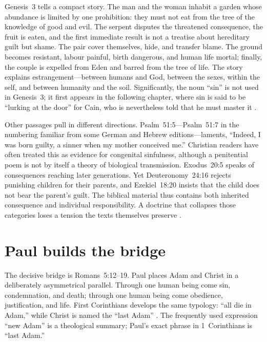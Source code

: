 ﻿\documentclass[12pt,a4paper]{book}
\begin{document}
Genesis~3 tells a compact story.  The man and the woman inhabit a garden whose
abundance is limited by one prohibition: they must not eat from the tree of
the knowledge of good and evil.  The serpent disputes the threatened
consequence, the fruit is eaten, and the first immediate result is not a
treatise about hereditary guilt but shame.  The pair cover themselves, hide,
and transfer blame.  The ground becomes resistant, labour painful, birth
dangerous, and human life mortal; finally, the couple is expelled from Eden
and barred from the tree of life.  The story explains estrangement---between
humans and God, between the sexes, within the self, and between humanity and
the soil.  Significantly, the noun ``sin'' is not used in Genesis~3; it first
appears in the following chapter, where sin is said to be ``lurking at the
door'' for Cain, who is nevertheless told that he must master it
\cite[Gen.~3; 4:7]{NRSVue2021}.

Other passages pull in different directions.  Psalm~51:5---Psalm~51:7 in the
numbering familiar from some German and Hebrew editions---laments, ``Indeed, I
was born guilty, a sinner when my mother conceived me.''  Christian readers
have often treated this as evidence for congenital sinfulness, although a
penitential poem is not by itself a theory of biological transmission.
Exodus~20:5 speaks of consequences reaching later generations.  Yet
Deuteronomy~24:16 rejects punishing children for their parents, and
Ezekiel~18:20 insists that the child does not bear the parent's guilt.  The
biblical material thus contains both inherited consequence and individual
responsibility.  A doctrine that collapses those categories loses a tension
the texts themselves preserve \cite{NRSVue2021}.

\section{Paul builds the bridge}

The decisive bridge is Romans~5:12--19.  Paul places Adam and Christ in a
deliberately asymmetrical parallel.  Through one human being come sin,
condemnation, and death; through one human being come obedience,
justification, and life.  First Corinthians develops the same typology:
``all die in Adam,'' while Christ is named the ``last Adam''
\cite[Rom.~5:12--19; 1~Cor.~15:21--22, 45]{NRSVue2021}.  The frequently used
expression ``new Adam'' is a theological summary; Paul's exact phrase in
1~Corinthians is ``last Adam.''
\end{document}
